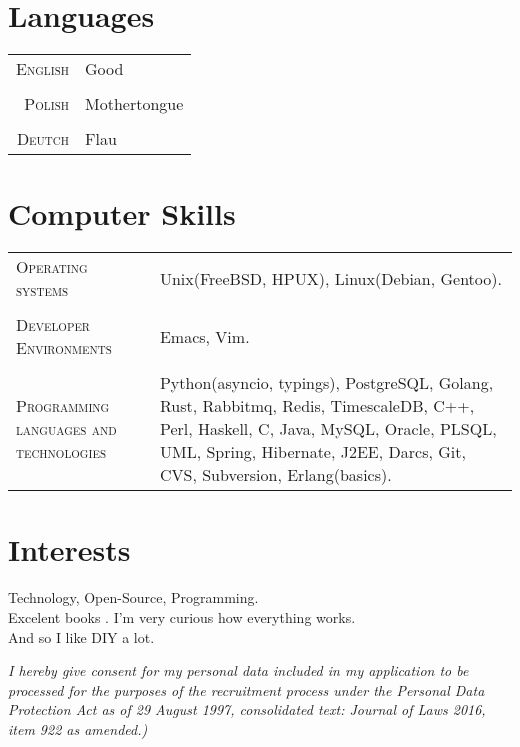 \documentclass[a4paper,9pt]{article} %
\begin{document}

\section{Languages}

\begin{tabular}{r|l}
\textsc{English} & Good\\
\multicolumn{2}{c}{} \\
\textsc{Polish} & Mothertongue\\
\multicolumn{2}{c}{} \\
\textsc{Deutch} & Flau\\
\end{tabular}


\section{Computer Skills}

\begin{tabular}{K | L}
\textsc{Operating systems} & Unix(FreeBSD, HPUX), Linux(Debian, Gentoo).\\
 \\
\textsc{Developer Environments} & Emacs, Vim.\\
 \\
\textsc{Programming languages and technologies} & Python(asyncio, typings), PostgreSQL,
Golang, Rust, Rabbitmq, Redis, TimescaleDB, C++, Perl, Haskell, C, Java, MySQL, Oracle, PLSQL, UML, Spring, Hibernate, J2EE, Darcs, Git, CVS, Subversion, Erlang(basics).\\
\end{tabular}

\section{Interests}

Technology, Open-Source, Programming.\\
Excelent books . I’m very curious how everything works.\\
And so I like DIY a lot.


\vspace*{3\baselineskip}


\textit{\small{I hereby give consent for my personal data included in my application to
    be processed for the purposes of the recruitment process under the
    Personal Data Protection Act as of 29 August 1997,
    consolidated text: Journal of Laws 2016, item 922 as amended.)}}
\end{document}

